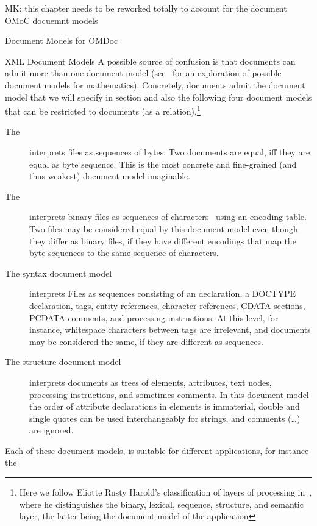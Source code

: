 \begin{oldpart}{MK: this chapter needs to be reworked totally to account for the document
    OMoC docuemnt models}
\begin{tchapter}[id=document-model]{Document Models for OMDoc}
\begin{tsection}[id=xml-DOM]{XML Document Models}
  A possible source of confusion is that documents can admit more than one document model
  (see~\cite{KohKoh:esmk05} for an exploration of possible document models for
  mathematics). Concretely, {\omdoc} documents admit the {\omdoc} document model that we
  will specify in section {} and also the following four {\xml} document
  models that can be restricted to {\omdoc} documents (as a relation).\footnote{Here we
    follow Eliotte Rusty Harold's classification of layers of {\xml} processing
    in~\cite{Harold:ex03}, where he distinguishes the binary, lexical, sequence,
    structure, and semantic layer, the latter being the document model of the {\xml}
    application}
\begin{description}
\item[The {}] interprets files as sequences of
  bytes.  Two documents are equal, iff they are equal as byte sequence. This
  is the most concrete and fine-grained (and thus weakest) document model
  imaginable.
\item[The {}] interprets binary files as sequences of
  {} characters~\cite{Unicode:tuc03} using an encoding table.  Two files
  may be considered equal by this document model even though they differ as binary files,
  if they have different encodings that map the byte sequences to the same sequence of
  {\unicode} characters.
\item[The {\xml} syntax document model] interprets
  {\unicode} Files as sequences consisting of an {\xml} declaration, a DOCTYPE
  declaration, tags, entity references, character references, CDATA sections, PCDATA
  comments, and processing instructions. At this level, for instance, whitespace
  characters between {\xml} tags are irrelevant, and {\xml} documents may be considered
  the same, if they are different as {\unicode} sequences.
\item[The {\xml} structure document model]
  interprets documents as {\xml} trees of elements, attributes, text nodes, processing
  instructions, and sometimes comments. In this document model the order of attribute
  declarations in {\xml} elements is immaterial, double and single quotes can be used
  interchangeably for strings, and {\xml} comments
  (\ldots\snippetin{-->}) are ignored.
\end{description}
Each of these document models, is suitable for different applications, for instance the

\end{tsection}
\end{tchapter}
\end{oldpart}
